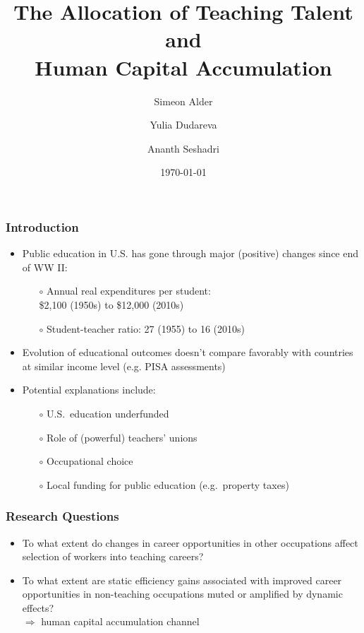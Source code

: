 \documentclass[11pt]{beamer}
\title{The Allocation of Teaching Talent and \\Human Capital Accumulation}
\author[shortname]{Simeon Alder\inst{1} \and Yulia Dudareva\inst{2} \and Ananth Seshadri\inst{1}}
\institute[shortinst]{\inst{1} University of Wisconsin--Madison \and \inst{2} University of Stavanger Business School}
\date{\today}
\begin{document}
	
	\begin{frame}
		\titlepage
	\end{frame}
	
	\begin{frame}
		\frametitle{Introduction}
		\vfill
		\begin{itemize}
			\item Public education in U.S. has gone through major (positive) changes since end of WW II:
			\begin{itemize}
				\item[$\circ$] Annual real expenditures per student: \\
				\$2,100 (1950s) to \$12,000 (2010s)
				\item[$\circ$] Student-teacher ratio: 27 (1955) to 16 (2010s)
			\end{itemize}
			\vfill
			\item Evolution of educational outcomes doesn't compare favorably
with countries at similar income level (e.g. PISA assessments)
			\vfill
			\item Potential explanations include:
			\begin{itemize}
				\item[$\circ$] U.S.~education underfunded %
				\item[$\circ$] Role of (powerful) teachers' unions \pause
				\item[$\circ$] \alert{Occupational choice} \pause
				\item[$\circ$] Local funding for public education (e.g.~property taxes)
			\end{itemize}
		\end{itemize}
		\vfill
	\end{frame}
	
	\begin{frame}
		\frametitle{Research Questions}
		\vfill
		\begin{itemize}
			\item To what extent do changes in career opportunities in other occupations affect selection of workers into teaching careers?
			\vfill
			\item To what extent are static efficiency gains associated with improved career opportunities in non-teaching occupations muted or amplified by dynamic effects?\\
			$\Rightarrow$ human capital accumulation channel
		\end{itemize}
		\vfill
	\end{frame}
	
\end{document}
